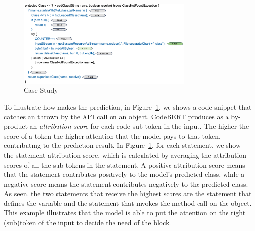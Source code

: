 \begin{figure}[t]
 	\centering
 	\includegraphics[width=3.4in]{rq1-case-study.png}
        \vspace{-20pt}
 	\caption{{\xblock} Case Study}
 	\label{fig:rq1-case}	
\end{figure}

 To illustrate how {\xblock} makes
the prediction, in Figure~\ref{fig:rq1-case}, we shows a code snippet
that catches an  thrown by the 
API call on an  object. CodeBERT produces as a
by-product an {\em attribution score} for each code sub-token in the
input. The higher the score of a token the higher attention that the
model pays to that token, contributing to the prediction result. In
Figure~\ref{fig:rq1-case}, for each statement, we show the statement
attribution score, which is calculated by averaging the attribution
scores of all the sub-tokens in the statement.
%
A positive attribution score means that the statement contributes
positively to the model's predicted class, while a negative score
means the statement contributes negatively to the predicted class.
As seen, the two statements that receive the highest scores are the
statement that defines the  variable and the
statement that invokes the  method call on the
 object. This example illustrates that the model
is able to put the attention on the right (sub)token
of the input to decide the need of the  block.
